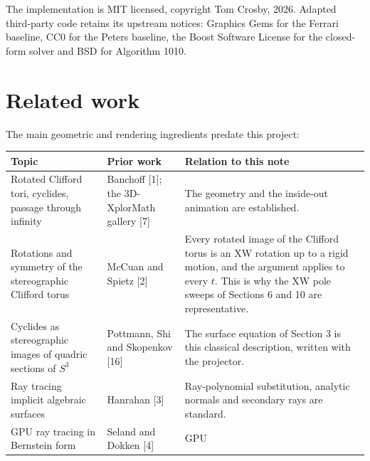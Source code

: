 \documentclass[11pt,a4paper]{article}
\begin{document}
The implementation is MIT licensed, copyright Tom Crosby, 2026. Adapted
third-party code retains its upstream notices: Graphics Gems for the
Ferrari baseline, CC0 for the Peters baseline, the Boost Software
License for the closed-form solver and BSD for Algorithm 1010.

\section{Related work}\label{related-work}

The main geometric and rendering ingredients predate this project:

{
\begin{longtable}[]{@{}
  >{\raggedright\arraybackslash}p{}
  >{\raggedright\arraybackslash}p{}
  >{\raggedright\arraybackslash}p{}@{}}
\toprule\noalign{}
\begin{minipage}[b]{\linewidth}\raggedright
Topic
\end{minipage} & \begin{minipage}[b]{\linewidth}\raggedright
Prior work
\end{minipage} & \begin{minipage}[b]{\linewidth}\raggedright
Relation to this note
\end{minipage} \\
\midrule\noalign{}
\endhead
\bottomrule\noalign{}
\endlastfoot
Rotated Clifford tori, cyclides, passage through infinity & Banchoff
{[}1{]}; the 3D-XplorMath gallery {[}7{]} & The geometry and the
inside-out animation are established. \\
Rotations and symmetry of the stereographic Clifford torus & McCuan and
Spietz {[}2{]} & Every rotated image of the Clifford torus is an XW
rotation up to a rigid motion, and the argument applies to every \(t\).
This is why the XW pole sweeps of Sections 6 and 10 are
representative. \\
Cyclides as stereographic images of quadric sections of \(S^3\) &
Pottmann, Shi and Skopenkov {[}16{]} & The surface equation of Section 3
is this classical description, written with the projector. \\
Ray tracing implicit algebraic surfaces & Hanrahan {[}3{]} &
Ray-polynomial substitution, analytic normals and secondary rays are
standard. \\
GPU ray tracing in Bernstein form & Seland and Dokken {[}4{]} & GPU

\end{longtable}}
\end{document}
